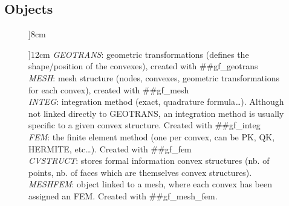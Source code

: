 \documentclass[11pt,a4paper]{article}
\newenvironment{minipage}[2]{}{}
\begin{document}
\subsection{Objects}
\begin{figure}
\begin{center}
\T \begin{minipage}[c]{8cm}
\T \end{minipage}\T \hspace{.3cm}
\end{center}
\T \begin{center}
\T \begin{minipage}[c]{12cm}
  \small
  \textit{GEOTRANS}: geometric transformations (defines the shape/position of the convexes), created with ##gf\_geotrans\\
  \textit{MESH}: mesh structure (nodes, convexes, geometric transformations for each convex), created with ##gf\_mesh\\
  \textit{INTEG}: integration method (exact, quadrature formula\ldots).  Although
  not linked directly to GEOTRANS, an integration method is
  usually specific to a given convex structure. Created with ##gf\_integ \\
  \textit{FEM}: the finite element method (one per convex, can be PK, QK,
  HERMITE,
  etc\ldots). Created with ##gf\_fem \\
  \textit{CVSTRUCT}: stores formal information convex structures (nb. of
  points, nb. of faces which are themselves convex structures).\\
  \textit{MESHFEM}: object linked to a mesh, where each convex has been
  assigned an FEM. Created with  ##gf\_mesh\_fem.\\

\end{minipage}
\end{center}
\end{figure}
\end{document}
